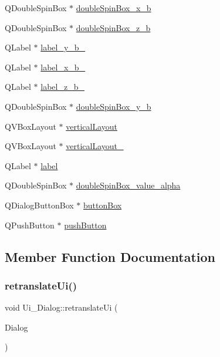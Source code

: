 \begin{DoxyCompactItemize}
\item 
Q\+Double\+Spin\+Box $\ast$ \hyperlink{class_ui___dialog_acb6d62af6a65734d26b419c39fac30bd}{double\+Spin\+Box\+\_\+x\+\_\+b}
\item 
Q\+Double\+Spin\+Box $\ast$ \hyperlink{class_ui___dialog_a20dc0d9e1d1c6829f8c1969bc1bfc6c8}{double\+Spin\+Box\+\_\+z\+\_\+b}
\item 
Q\+Label $\ast$ \hyperlink{class_ui___dialog_a0fced57090e5ac447ac60756bc36a68d}{label\+\_\+y\+\_\+b\+\_}
\item 
Q\+Label $\ast$ \hyperlink{class_ui___dialog_a60553ee369483b9b346c5ad7377765e2}{label\+\_\+x\+\_\+b\+\_}
\item 
Q\+Label $\ast$ \hyperlink{class_ui___dialog_a6ca6cabd6bb980d5804d866d1c166dd7}{label\+\_\+z\+\_\+b\+\_}
\item 
Q\+Double\+Spin\+Box $\ast$ \hyperlink{class_ui___dialog_aa3d1e02dcb0016a94ac9810fff2c55f4}{double\+Spin\+Box\+\_\+y\+\_\+b}
\item 
Q\+V\+Box\+Layout $\ast$ \hyperlink{class_ui___dialog_a02f973813b741621c5461918b3d9d4bb}{vertical\+Layout}
\item 
Q\+V\+Box\+Layout $\ast$ \hyperlink{class_ui___dialog_a5ea05598d639698eabf0cbc00b1f0180}{vertical\+Layout\+\_}
\item 
Q\+Label $\ast$ \hyperlink{class_ui___dialog_ac3844fd0281707dc5535826da7506ca5}{label}
\item 
Q\+Double\+Spin\+Box $\ast$ \hyperlink{class_ui___dialog_a45223f3641a2da220e880eba8c7ae100}{double\+Spin\+Box\+\_\+value\+\_\+alpha}
\item 
Q\+Dialog\+Button\+Box $\ast$ \hyperlink{class_ui___dialog_a271a59402f80983c2722bb455db37365}{button\+Box}
\item 
Q\+Push\+Button $\ast$ \hyperlink{class_ui___dialog_aebeace7895da27076f8f90c301742ec3}{push\+Button}
\end{DoxyCompactItemize}


\subsection{Member Function Documentation}
\hypertarget{class_ui___dialog_afa0ccb6f716ca6178260522a193c250e}{}\label{class_ui___dialog_afa0ccb6f716ca6178260522a193c250e} 
\subsubsection{\texorpdfstring{retranslate\+Ui()}{retranslateUi()}}
{\footnotesize\ttfamily void Ui\+\_\+\+Dialog\+::retranslate\+Ui (\begin{DoxyParamCaption}\item[{Q\+Dialog $\ast$}]{Dialog }\end{DoxyParamCaption})\hspace{0.3cm}{\ttfamily [inline]}}

